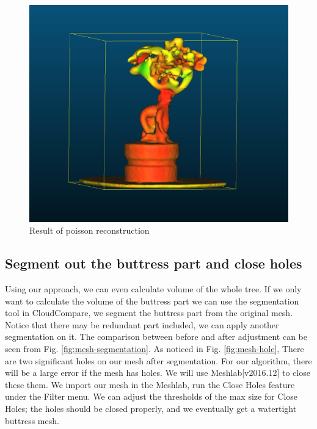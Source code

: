 \documentclass[runningheads,a4paper]{llncs}
\begin{document}
\begin{figure}
\centering
\includegraphics[scale=0.4]{tree_mesh.PNG}
\caption{Result of poisson reconstruction}
\label{fig:tree-mesh}
\end{figure}
\newpage
\subsection{Segment out the buttress part and close holes}
Using our approach, we can even calculate volume of the whole tree. If we only want to calculate the volume of the buttress part we can use the segmentation tool in CloudCompare, we segment the buttress part from the original mesh. Notice that there may be redundant part included, we can apply another segmentation on it. The comparison between before and after adjustment can be seen from Fig. \ref{fig:mesh-segmentation}. As noticed in Fig. \ref{fig:mesh-hole}, There are two significant holes on our mesh after segmentation. For our algorithm, there will be a large error if the mesh has holes. We will use Meshlab[v2016.12] to close these them. We import our mesh in the Meshlab, run the Close Holes feature under the Filter menu. 
We can adjust the thresholds of the max size for Close Holes; the holes should be closed properly, and we eventually get a watertight buttress mesh. 
\end{document}
